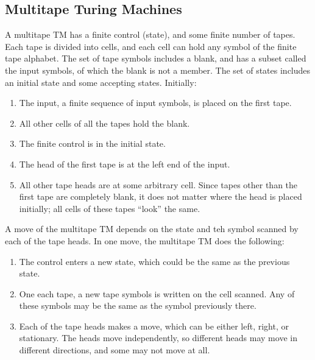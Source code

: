 \documentclass[]{article}
\begin{document}
\subsection*{Multitape Turing Machines}
A multitape TM has a finite control (state), and some finite number of tapes. 
Each tape is divided into cells, and each cell can hold any symbol of the 
finite tape alphabet. The set of tape symbols includes a blank, and has a 
subset called the input symbols, of which the blank is not a member. The set 
of states includes an initial state and some accepting states. Initially:
\begin{enumerate}
\item The input, a finite sequence of input symbols, is placed on the 
first tape.
\item All other cells of all the tapes hold the blank.
\item The finite control is in the initial state.
\item The head of the first tape is at the left end of the input.
\item All other tape heads are at some arbitrary cell. Since tapes other 
than the first tape are completely blank, it does not matter where the 
head is placed initially; all cells of these tapes ``look'' the same.
\end{enumerate}
A move of the multitape TM depends on the state and teh symbol scanned by each 
of the tape heads. In one move, the multitape TM does the following:
\begin{enumerate}
\item The control enters a new state, which could be the same as the 
previous state.
\item One each tape, a new tape symbols is written on the cell scanned. 
Any of these symbols may be the same as the symbol previously there.
\item Each of the tape heads makes a move, which can be either left, 
right, or stationary. The heads move independently, so different heads may 
move in different directions, and some may not move at all.
\end{enumerate}
\end{document}
